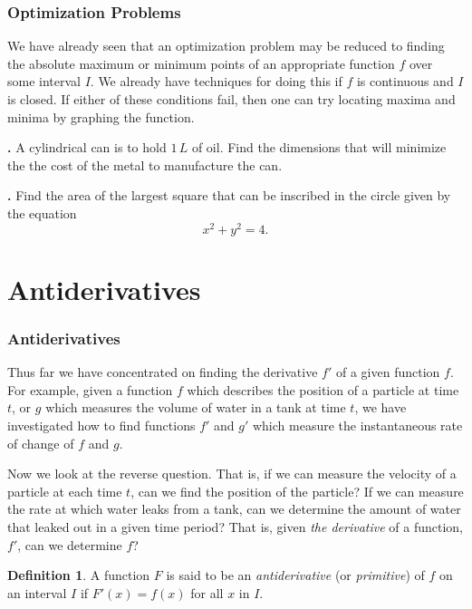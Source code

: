 \documentclass[t]{beamer}
\theoremstyle{plain}
\theoremstyle{definition}
\newtheorem{dfn}{Definition}
\newcounter{heading}
\newcommand{\newhead}[1]{\medskip\stepcounter{heading}\noindent\textbf{\hspace{0.2cm}{#1}.}}
\begin{document}
\begin{frame}
\frametitle{Optimization Problems}

\noindent We have already seen that an optimization problem may be reduced to finding the absolute maximum or minimum points of an appropriate function $f$ over some interval $I$. We already have techniques for doing this if $f$ is continuous and $I$ is closed. If either of these conditions fail, then one can try locating maxima and minima by graphing the function.\pause

\smallskip

\newhead{Example} A cylindrical can is to hold $1\,L$ of oil. Find the dimensions that will minimize the the cost of the metal to manufacture the can.\pause

\smallskip

\newhead{Example} Find the area of the largest square that can be inscribed in the circle given by the equation \[ x^2+y^2=4. \]
\end{frame}

\section{Antiderivatives}
\begin{frame}
\frametitle{Antiderivatives}

\noindent Thus far we have concentrated on finding the derivative $f'$ of a given function $f$.  For example, given a function $f$ which describes the position of a particle at time $t$, or $g$ which measures the volume of water in a tank at time $t$, we have investigated how to find functions $f'$ and $g'$ which measure the instantaneous rate of change of $f$ and $g$.  \pause

\smallskip
\noindent Now we look at the reverse question.  That is, if we can measure the velocity of a particle at each time $t$, can we find the position of the particle?  If we can measure the rate at which water leaks from a tank, can we determine the amount of water that leaked out in a given time period?  That is, given \emph{the derivative} of a function, $f'$, can we determine $f$? \pause

\smallskip
\begin{dfn} A function $F$ is said to be an \textit{antiderivative} (or \textit{primitive}) of $f$ on an interval $I$ if $F'(x)=f(x)$ for all $x$ in $I$. \end{dfn}

\end{frame}
\end{document}
